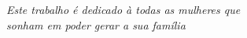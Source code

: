 \begin{dedicatoria}
   \vspace*{\fill}
   \centering
   \noindent

   \textit{Este trabalho é dedicado à todas as mulheres que\\
   sonham em poder gerar a sua família} \vspace*{\fill}
\end{dedicatoria}
